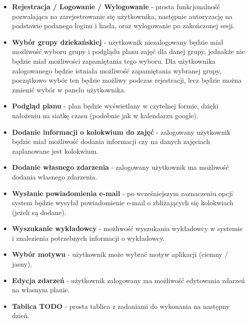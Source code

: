 \documentclass[a4paper,11pt]{uzreport}
\begin{document}
    \begin{itemize}[leftmargin=0.50in]
    
        \item \textbf{Rejestracja / Logowanie / Wylogowanie} - prosta funkcjonalność pozwalająca na zarejestrowanie się użytkownika, następnie autoryzację na podstawie podanego loginu i hasła, oraz wylogowanie po zakończonej sesji.
        
        \item \textbf{Wybór grupy dziekańskiej} - użytkownik niezalogowany będzie miał możliwość wyboru grupy i podglądu planu zajęć dla danej grupy, jednakże nie będzie miał możliwości zapamiętania tego wyboru. Dla użytkownika zalogowanego będzie istniała możliwość zapamiętania wybranej grupy, początkowo wybór ten będzie możliwy podczas rejestracji, lecz będzie można zmienić wybór w panelu użytkownika.
        
        \item \textbf{Podgląd planu} - plan będzie wyświetlany w czytelnej formie, dzięki nałożeniu na siatkę czasu (podobnie jak w kalendarzu google).
        
        \item \textbf{Dodanie informacji o kolokwium do zajęć} - zalogowany użytkownik będzie miał możliwość dodania informacji czy na danych zajęciach zaplanowane jest kolokwium.
        
        \item \textbf{Dodanie własnego zdarzenia} - zalogowany użytkownik ma możliwość dodania własnego zdarzenia.
        
        \item \textbf{Wysłanie powiadomienia e-mail} - po wcześniejszym zaznaczeniu opcji system będzie wysyłał powiadomienie e-mail o zbliżających się kolokwiach (jeżeli są dodane).
        
        \item \textbf{Wyszukanie wykładowcy} - możliwość wyszukania wykładowcy w systemie i znalezienia potrzebnych informacji o wykładowcy.
        
        \item \textbf{Wybór motywu} - użytkownik może wybrać motyw aplikacji (ciemny / jasny).
        
        \item \textbf{Edycja zdarzeń} - użytkownik zalogowany ma możliwość edytowania zdarzeń na własnym planie.
        
        \item \textbf{Tablica TODO} - prosta tablica z zadaniami do wykonania na następny dzień.
        
    \end{itemize}
    
\end{document}
